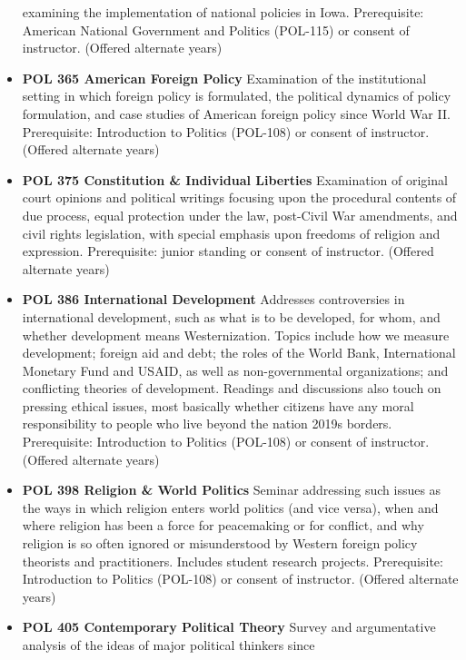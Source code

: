 \documentclass[
  letterpaper,
]{scrbook}
\begin{document}
\begin{itemize}
  examining the implementation of national policies in Iowa.
  Prerequisite: American National Government and Politics (POL-115) or
  consent of instructor. (Offered alternate years)\\
\item
  \textbf{POL 365 American Foreign Policy} Examination of the
  institutional setting in which foreign policy is formulated, the
  political dynamics of policy formulation, and case studies of American
  foreign policy since World War II. Prerequisite: Introduction to
  Politics (POL-108) or consent of instructor. (Offered alternate
  years)\\
\item
  \textbf{POL 375 Constitution \& Individual Liberties} Examination of
  original court opinions and political writings focusing upon the
  procedural contents of due process, equal protection under the law,
  post-Civil War amendments, and civil rights legislation, with special
  emphasis upon freedoms of religion and expression. Prerequisite:
  junior standing or consent of instructor. (Offered alternate years)\\
\item
  \textbf{POL 386 International Development} Addresses controversies in
  international development, such as what is to be developed, for whom,
  and whether development means Westernization. Topics include how we
  measure development; foreign aid and debt; the roles of the World
  Bank, International Monetary Fund and USAID, as well as
  non-governmental organizations; and conflicting theories of
  development. Readings and discussions also touch on pressing ethical
  issues, most basically whether citizens have any moral responsibility
  to people who live beyond the nation 2019s borders. Prerequisite:
  Introduction to Politics (POL-108) or consent of instructor. (Offered
  alternate years)
\item
  \textbf{POL 398 Religion \& World Politics} Seminar addressing such
  issues as the ways in which religion enters world politics (and vice
  versa), when and where religion has been a force for peacemaking or
  for conflict, and why religion is so often ignored or misunderstood by
  Western foreign policy theorists and practitioners. Includes student
  research projects. Prerequisite: Introduction to Politics (POL-108) or
  consent of instructor. (Offered alternate years)\\
\item
  \textbf{POL 405 Contemporary Political Theory} Survey and
  argumentative analysis of the ideas of major political thinkers since

\end{itemize}
\end{document}
